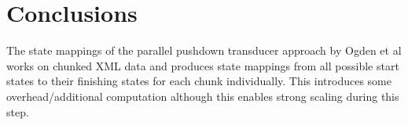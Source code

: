 \section{Conclusions}

The state mappings of the parallel pushdown transducer approach by Ogden et al
\cite{Ogden2013}  works on chunked XML data and produces state mappings from
all possible start states to their finishing states for each chunk individually. This 
introduces some overhead/additional computation although this enables strong
scaling during this step.







%
%
%


